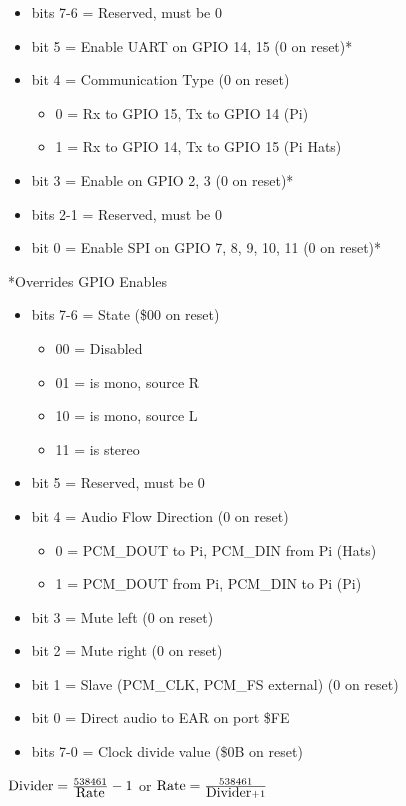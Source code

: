 \begin{itemize}
\item bits 7-6 = Reserved, must be 0
\item bit 5 = Enable UART on GPIO 14, 15 (0 on reset)*
\item bit 4 = Communication Type (0 on reset)
  \begin{itemize}
  \item 0 = Rx to GPIO 15, Tx to GPIO 14 (Pi)
  \item 1 = Rx to GPIO 14, Tx to GPIO 15 (Pi Hats)
  \end{itemize}
\item bit 3 = Enable \iic on GPIO 2, 3 (0 on reset)*
\item bits 2-1 = Reserved, must be 0
\item bit 0 = Enable SPI on GPIO 7, 8, 9, 10, 11 (0 on reset)*
\end{itemize}
*Overrides GPIO Enables

\begin{itemize}
\item bits 7-6 = \iis State (\$00 on reset)
  \begin{itemize}
  \item 00 = \iis Disabled
  \item 01 = \iis is mono, source R
  \item 10 = \iis is mono, source L
  \item 11 = \iis is stereo
  \end{itemize}
\item bit 5 = Reserved, must be 0
\item bit 4 = Audio Flow Direction (0 on reset)
  \begin{itemize}
  \item 0 = PCM\_DOUT to Pi, PCM\_DIN from Pi (Hats)
  \item 1 = PCM\_DOUT from Pi, PCM\_DIN to Pi (Pi)
  \end{itemize}
\item bit 3 = Mute left (0 on reset)
\item bit 2 = Mute right (0 on reset)
\item bit 1 = Slave (PCM\_CLK, PCM\_FS external) (0 on reset)
\item bit 0 = Direct \iis audio to EAR on port \$FE
\end{itemize}

\begin{itemize}
\item bits 7-0 = Clock divide value (\$0B on reset)
\end{itemize}
$\hbox{Divider}=\frac{538461}{\hbox{Rate}}-1$ or $\hbox{Rate}=\frac{538461}{\hbox{Divider}+1}$

